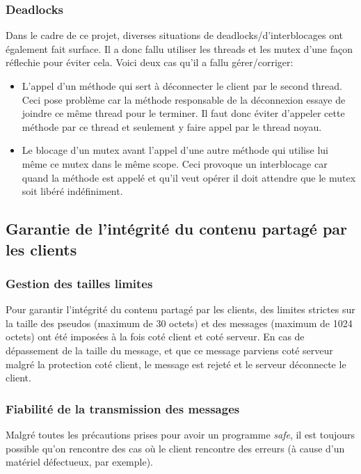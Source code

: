 \documentclass{article}
\begin{document}
\subsubsection*{Deadlocks}
Dans le cadre de ce projet, diverses situations de deadlocks/d'interblocages ont également fait surface. Il a donc fallu utiliser les threads et les mutex d'une façon réflechie pour éviter cela. Voici deux cas qu'il a fallu gérer/corriger:
\begin{itemize}
    \item L'appel d'un méthode qui sert à déconnecter le client par le second thread. Ceci pose problème car la méthode responsable de la déconnexion essaye de joindre ce même thread pour le terminer. Il faut donc éviter d'appeler cette méthode par ce thread et seulement y faire appel par le thread noyau.
    \item Le blocage d'un mutex avant l'appel d'une autre méthode qui utilise lui même ce mutex dans le même scope. Ceci provoque un interblocage car quand la méthode est appelé et qu'il veut opérer il doit attendre que le mutex soit libéré indéfiniment.
\end{itemize}



\subsection{Garantie de l'intégrité du contenu partagé par les clients}

\subsubsection{Gestion des tailles limites}

Pour garantir l'intégrité du contenu partagé par les clients, des limites strictes sur la taille des pseudos (maximum de 30 octets) et des messages (maximum de 1024 octets) ont été imposées à la fois coté client et coté serveur. En cas de dépassement de la taille du message, et que ce message parviens coté serveur malgré la protection coté client, le message est rejeté et le serveur déconnecte le client.

\subsubsection{Fiabilité de la transmission des messages}

Malgré toutes les précautions prises pour avoir un programme \textit{safe}, il est toujours possible qu'on rencontre des cas où le client rencontre des erreurs (à cause d'un matériel défectueux, par exemple).
\end{document}
